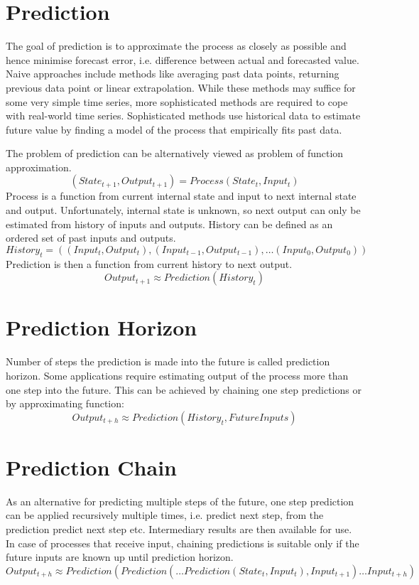 \documentclass[12pt,oneside]{fithesis2}
\begin{document}
\section{Prediction}
The goal of prediction is to approximate the process as closely as possible and hence minimise forecast error, i.e. difference between actual and forecasted value. Naive approaches include methods like averaging past data points, returning previous data point or linear extrapolation. While these methods may suffice for some very simple time series, more sophisticated methods are required to cope with real-world time series. Sophisticated methods use historical data to estimate future value by finding a model of the process that empirically fits past data. \par
The problem of prediction can be alternatively viewed as problem of function approximation.
	$$\left(State_{t+1}, Output_{t+1}\right) = Process(State_t, Input_t)$$
Process is a function from current internal state and input to next internal state and output. Unfortunately, internal state is unknown, so next output can only be estimated from history of inputs and outputs. History can be defined as an ordered set of past inputs and outputs.
	$$History_t = \left( (Input_{t}, Output_{t}), (Input_{t-1}, Output_{t-1}), \dots (Input_{0}, Output_{0}) \right)$$
Prediction is then a function from current history to next output.
	$$Output_{t+1} \approx Prediction( History_t )$$

\section{Prediction Horizon}
Number of steps the prediction is made into the future is called prediction horizon. Some applications require estimating output of the process more than one step into the future. This can be achieved by chaining one step predictions or by approximating function:
	$$Output_{t+h} \approx Prediction( History_t, FutureInputs )$$

\section{Prediction Chain}
As an alternative for predicting multiple steps of the future, one step prediction can be applied recursively multiple times, i.e. predict next step, from the prediction predict next step etc. Intermediary results are then available for use. In case of processes that receive input, chaining predictions is suitable only if the future inputs are known up until prediction horizon.
$$Output_{t+h} \approx Prediction( Prediction(  \dots Prediction(State_t, Input_t), Input_{t+1} ) \dots Input_{t+h} )$$
\end{document}
